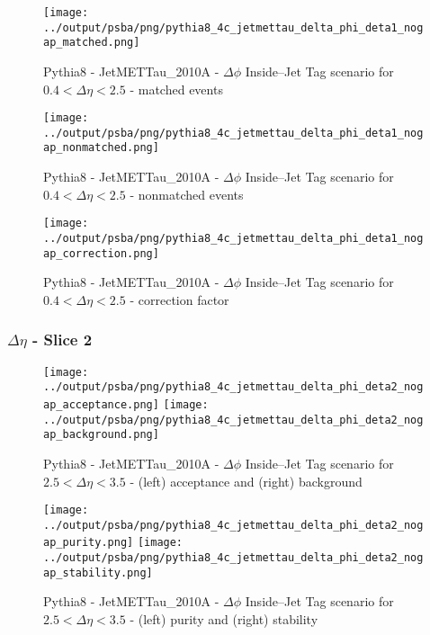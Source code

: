 \documentclass[11pt]{book}
\begin{document}
\begin{figure}[ht]
\centering
\texttt{[image: ../output/psba/png/pythia8\_4c\_jetmettau\_delta\_phi\_deta1\_nogap\_matched.png]}
\caption{Pythia8 - JetMETTau\_2010A - $\Delta\phi$ Inside--Jet Tag scenario for $0.4 < \Delta\eta < 2.5$ - matched events}
\label{fig:p8_jetmettau_delta_phi_deta1_nogap_matched}
\end{figure}

\begin{figure}[ht]
\centering
\texttt{[image: ../output/psba/png/pythia8\_4c\_jetmettau\_delta\_phi\_deta1\_nogap\_nonmatched.png]}
\caption{Pythia8 - JetMETTau\_2010A - $\Delta\phi$ Inside--Jet Tag scenario for $0.4 < \Delta\eta < 2.5$ - nonmatched events}
\label{fig:p8_jetmettau_delta_phi_deta1_nogap_nonmatched}
\end{figure}

\begin{figure}[ht]
\centering
\texttt{[image: ../output/psba/png/pythia8\_4c\_jetmettau\_delta\_phi\_deta1\_nogap\_correction.png]}
\caption{Pythia8 - JetMETTau\_2010A - $\Delta\phi$ Inside--Jet Tag scenario for $0.4 < \Delta\eta < 2.5$ - correction factor}
\label{fig:p8_jetmettau_delta_phi_deta1_nogap_correction}
\end{figure}


\clearpage
\subsubsection{$\Delta\eta$ - Slice 2}
\begin{figure}[ht]
\centering
\texttt{[image: ../output/psba/png/pythia8\_4c\_jetmettau\_delta\_phi\_deta2\_nogap\_acceptance.png]}
\texttt{[image: ../output/psba/png/pythia8\_4c\_jetmettau\_delta\_phi\_deta2\_nogap\_background.png]}
\caption{Pythia8 - JetMETTau\_2010A - $\Delta\phi$ Inside--Jet Tag scenario for $2.5 < \Delta\eta < 3.5$ - (left) acceptance and (right) background}
\label{fig:p8_jetmettau_delta_phi_deta2_nogap_ab}
\end{figure}

\begin{figure}[ht]
\centering
\texttt{[image: ../output/psba/png/pythia8\_4c\_jetmettau\_delta\_phi\_deta2\_nogap\_purity.png]}
\texttt{[image: ../output/psba/png/pythia8\_4c\_jetmettau\_delta\_phi\_deta2\_nogap\_stability.png]}
\caption{Pythia8 - JetMETTau\_2010A - $\Delta\phi$ Inside--Jet Tag scenario for $2.5 < \Delta\eta < 3.5$ - (left) purity and (right) stability}
\label{fig:p8_jetmettau_delta_phi_deta2_nogap_ps}
\end{figure}
\end{document}

